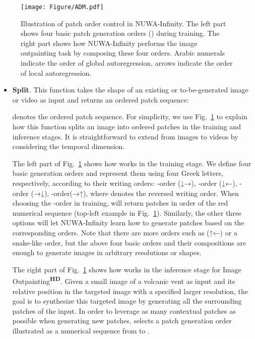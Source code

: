 \documentclass{article}
\begin{document}
\begin{figure}[t!]
    \centering
    \texttt{[image: Figure/ADM.pdf]}
    \caption{Illustration of patch order control in NUWA-Infinity. The left part shows four basic patch generation orders () during training. The right part shows how NUWA-Infinity performs the image outpainting task by composing these four orders. Arabic numerals indicate the order of global autoregression, arrows indicate the order of local autoregression.}
    \label{fig:adc}
    \vspace{-3mm}
\end{figure}
\begin{itemize}[leftmargin=*]
\item \textbf{Split}. This function takes the shape of an existing or to-be-generated image or video  as input and returns an ordered patch sequence:

 denotes the ordered patch sequence. For simplicity, we use Fig.~\ref{fig:adc} to explain how this function splits an image into ordered patches in the training and inference stages. It is straightforward to extend from images to videos by considering the temporal dimension.

The left part of Fig.~\ref{fig:adc} shows how  works in the training stage. We define four basic generation orders and represent them using four Greek letters, respectively, according to their writing orders: -order (↓→), -order (↓←), -order (→↓), -order(→↑), where  denotes the reversed writing order. When choosing the -order in training,  will return patches in order of the red numerical sequence (top-left example in Fig.~\ref{fig:adc}). Similarly, the other three options will let NUWA-Infinity learn how to generate patches based on the corresponding orders. Note that there are more orders such as (↑←) or a snake-like order, but the above four basic orders and their compositions are enough to generate images in arbitrary resolutions or shapes.

The right part of Fig.~\ref{fig:adc} shows how  works in the inference stage for Image Outpainting\textsuperscript{\textbf{HD}}. Given a small image of a volcanic vent as input and its relative position in the targeted image with a specified larger resolution, the goal is to synthesize this targeted image by generating all the surrounding patches of the input. In order to leverage as many contextual patches as possible when generating new patches, 
 selects a patch generation order illustrated as a numerical sequence from  to . 




\end{itemize}
\end{document}
